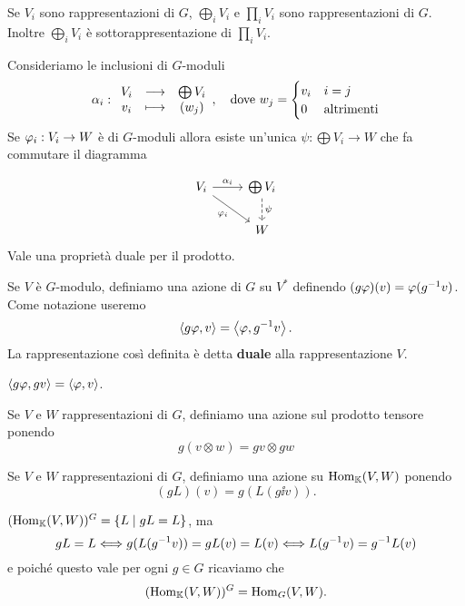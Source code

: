 Se $V_i$ sono rappresentazioni di $G$, $\bigoplus_i V_i$ e $\prod_i V_i$ sono rappresentazioni di $G$. Inoltre $\bigoplus_i V_i$ \`e sottorappresentazione di $\prod_i V_i$.
\begin{remark}
Consideriamo le inclusioni di $G$-moduli
\[\alpha_i:\begin{array}{ccc} {V_i} & \longrightarrow & {\bigoplus V_i}\\ {v_i} & \longmapsto & {(w_j)} \end{array},\quad\text{dove }w_j=\begin{cases}
v_i &i=j\\
0 &\text{altrimenti}
\end{cases}\]
Se $\varphi_i:V_i\to W$ \`e di $G$-moduli allora esiste un'unica $\psi:\bigoplus V_i\to W$ che fa commutare il diagramma

\[\begin{tikzcd}
	{V_i} & {\bigoplus V_i} \\
	& W
	\arrow["{\al_i}", from=1-1, to=1-2]
	\arrow["{\vp_i}"', from=1-1, to=2-2]
	\arrow["\psi", dashed, from=1-2, to=2-2]
\end{tikzcd}\]
Vale una propriet\`a duale per il prodotto.
\end{remark}

\begin{definition}
Se $V$ \`e $G$-modulo, definiamo una azione di $G$ su $V^\ast$ definendo $(g\varphi)(v)=\varphi(g^{-1} v)$. Come notazione useremo
\[\left\langle {g\varphi,v}\right\rangle=\left\langle {\varphi,g^{-1}v}\right\rangle.\]
La rappresentazione cos\`i definita \`e detta \textbf{duale} alla rappresentazione $V$.
\end{definition}
\begin{remark}
$\left\langle {g\varphi,gv}\right\rangle=\left\langle {\varphi,v}\right\rangle$.
\end{remark}

\begin{definition}
Se $V$ e $W$ rappresentazioni di $G$, definiamo una azione sul prodotto tensore ponendo
\[g(v\otimes w)=gv\otimes gw\]
\end{definition}

\begin{definition}[Omomorfismi]
    Se $V$ e $W$ rappresentazioni di $G$, definiamo una azione su $\operatorname{Hom}_{\mathbb{K}}(V,W)$ ponendo 
    \[(gL)(v)=g(L(g\ii v)).\]
\end{definition}
\begin{remark}
$(\operatorname{Hom}_{\mathbb{K}}(V,W))^G=\left\{{L\mid gL=L}\right\}$, ma
\[gL=L\Longleftrightarrow g(L(g^{-1} v))=gL(v)=L(v)\Longleftrightarrow L(g^{-1} v)=g^{-1} L(v)\]
e poich\'e questo vale per ogni $g\in G$ ricaviamo che
\[(\operatorname{Hom}_{\mathbb{K}}(V,W))^G=\operatorname{Hom}_G(V,W).\]
\end{remark}

